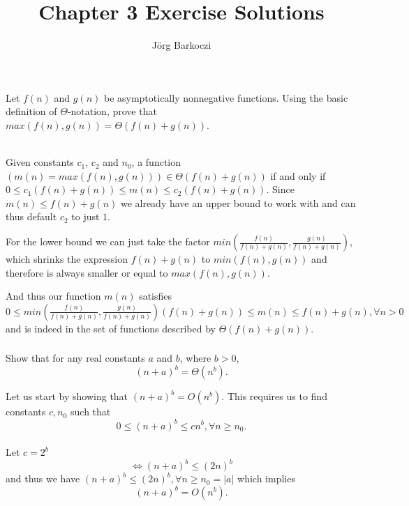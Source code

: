 \documentclass[11pt]{article}
\author{Jörg Barkoczi}
\title{\vspace{-2.0cm}Chapter 3 Exercise Solutions}
\date{ }
\numberwithin{equation}{section}
\renewcommand{\iff}{\Leftrightarrow}
\begin{document}
\maketitle

\setcounter{section}{2}
\section{}

\setcounter{subsection}{0}
\subsection{}

\renewcommand{\thesubsubsection}{\thesubsection-\arabic{subsubsection}}
\subsubsection{}
Let $f(n)$ and $g(n)$ be asymptotically nonnegative functions. Using the basic
definition of $\Theta$-notation, prove that $max(f(n), g(n)) = \Theta (f(n) + g(n))$.
\\~

Given constants $c_1$, $c_2$ and $n_0$, a function $(m(n) = max(f(n), g(n))) \in
\Theta (f(n) + g(n))$ if and only if $ 0 \leq c_1(f(n) + g(n)) \leq m(n) \leq c_2(f(n) + g(n))$.
Since $m(n) \leq f(n) + g(n)$ we already have an upper bound to work with and can thus default
$c_2$ to just $1$.

For the lower bound we can just take the factor $min({\frac{f(n)}{f(n) + g(n)}, \frac{g(n)}{f(n) + g(n)}})$, which
shrinks the expression $f(n) + g(n)$ to $min(f(n), g(n))$ and therefore is always smaller or equal to $max(f(n), g(n))$.

And thus our function $m(n)$ satisfies $0 \leq min({\frac{f(n)}{f(n) + g(n)}, \frac{g(n)}{f(n) + g(n)}}) (f(n) + g(n))
\leq m(n) \leq f(n) + g(n), \forall n > 0$ and is indeed in the set of functions described by $\Theta(f(n) + g(n))$.

\subsubsection{}
Show that for any real constants $a$ and $b$, where $b > 0$,
\[(n+a)^b = \Theta(n^b).\]

Let us start by showing that $(n+a)^b = O(n^b)$. This requires us to find constants $c, n_0$
such that 
\[0 \leq (n+a)^b \leq cn^b, \forall n \geq n_0.\]\\
Let $c = 2^b$ 
\[\iff (n+a)^b \leq (2n)^b\]
and thus we have $(n+a)^b \leq (2n)^b, \forall n \geq n_0 = |a|$ which implies 
\[(n+a)^b = O(n^b).\]
\end{document}
